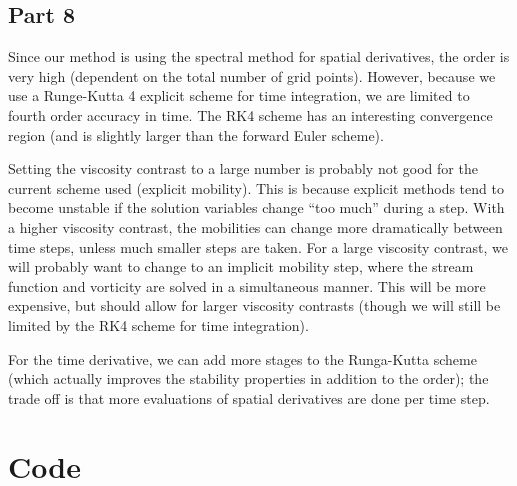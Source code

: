 \documentclass{article}
\begin{document}
\subsection{Part 8}
Since our method is using the spectral method for spatial derivatives, the order is very high (dependent on the total number of grid points).
However, because we use a Runge-Kutta 4 explicit scheme for time integration, we are limited to fourth order accuracy in time.
The RK4 scheme has an interesting convergence region (and is slightly larger than the forward Euler scheme).

Setting the viscosity contrast to a large number is probably not good for the current scheme used (explicit mobility).
This is because explicit methods tend to become unstable if the solution variables change ``too much'' during a step.
With a higher viscosity contrast, the mobilities can change more dramatically between time steps, unless much smaller steps are taken.
For a large viscosity contrast, we will probably want to change to an implicit mobility step, where the stream function and vorticity are solved in a simultaneous manner.
This will be more expensive, but should allow for larger viscosity contrasts (though we will still be limited by the RK4 scheme for time integration).

For the time derivative, we can add more stages to the Runga-Kutta scheme (which actually improves the stability properties in addition to the order); the trade off is that more evaluations of spatial derivatives are done per time step.

\clearpage
\appendix
\section{Code}




\end{document}
